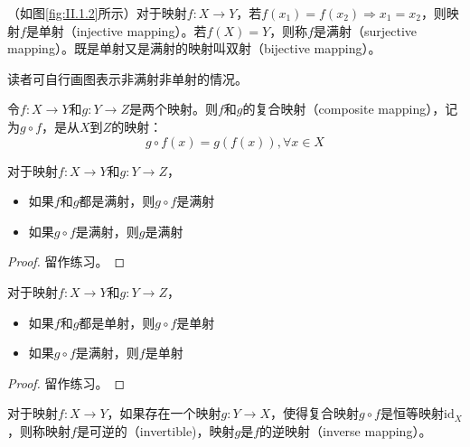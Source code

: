 \documentclass[main.tex]{subfiles}
\begin{document}
\begin{definition}[单射、双射、满射]
（如图\ref{fig:II.1.2}所示）对于映射$f:X\rightarrow Y$，若$f\left(x_1\right)=f\left(x_2\right)\Rightarrow x_1=x_2$，则映射$f$是单射（injective mapping）。若$f\left(X\right)=Y$，则称$f$是满射（surjective mapping）。既是单射又是满射的映射叫双射（bijective mapping）。
\end{definition}

读者可自行画图表示非满射非单射的情况。

\begin{definition}[复合映射]
令$f:X\rightarrow Y$和$g:Y\rightarrow Z$是两个映射。则$f$和$g$的复合映射（composite mapping），记为$g\circ f$，是从$X$到$Z$的映射：
\[g\circ f\left(x\right)=g\left(f\left(x\right)\right),\forall x\in X\]
\end{definition}

\begin{theorem}
对于映射$f:X\rightarrow Y$和$g: Y\rightarrow Z$，
\begin{itemize}
    \item 如果$f$和$g$都是满射，则$g\circ f$是满射
    \item 如果$g\circ f$是满射，则$g$是满射
\end{itemize}
\end{theorem}
\begin{proof}
留作练习。
\end{proof}

\begin{theorem}
对于映射$f:X\rightarrow Y$和$g: Y\rightarrow Z$，
\begin{itemize}
    \item 如果$f$和$g$都是单射，则$g\circ f$是单射
    \item 如果$g\circ f$是满射，则$f$是单射
\end{itemize}
\end{theorem}
\begin{proof}
留作练习。
\end{proof}

\begin{definition}[逆映射]\label{def:II.1.14}
对于映射$f:X\rightarrow Y$，如果存在一个映射$g:Y\rightarrow X$，使得复合映射$g\circ f$是恒等映射$\mathrm{id}_X$，则称映射$f$是可逆的（invertible)，映射$g$是$f$的逆映射（inverse mapping）。
\end{definition}
\end{document}
